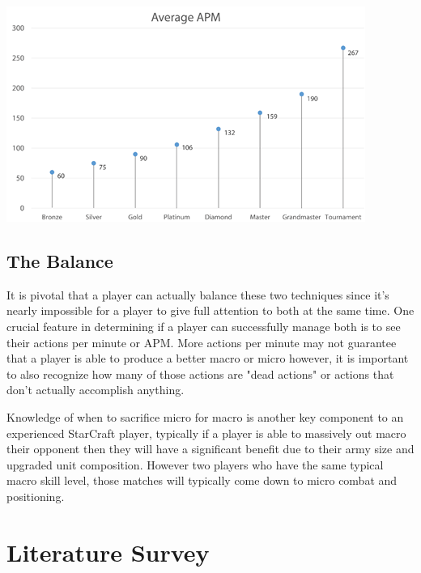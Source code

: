 \documentclass[a4paper,12pt]{report}
\begin{document}
\begin{center}
    \captionsetup{type=figure}
    \includegraphics[width=.9\linewidth]{media/AverageAPM.png}
\end{center}

\subsection{The Balance}

It is pivotal that a player can actually balance these two techniques since it’s nearly impossible for a player to give full attention to both at the same time. One crucial feature in determining if a player can successfully manage both is to see their actions per minute or APM. More actions per minute may not guarantee that a player is able to produce a better macro or micro however, it is important to also recognize how many of those actions are "dead actions" or actions that don’t actually accomplish anything.

Knowledge of when to sacrifice micro for macro is another key component to an experienced StarCraft player, typically if a player is able to massively out macro their opponent then they will have a significant benefit due to their army size and upgraded unit composition. However two players who have the same typical macro skill level, those matches will typically come down to micro combat and positioning.

\section{Literature Survey}
\end{document}
